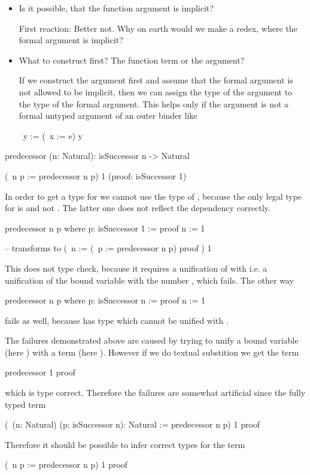\begin{itemize}
\item Is it possible, that the function argument is implicit?

    First reaction: Better not. Why on earth would we make a redex, where the
    formal argument is implicit?

\item What to construct first? The function term or the argument?

    If we construct the argument first and assume that the formal argument is
    not allowed to be implicit, then we can assign the type of the argument to
    the type of the formal argument. This helps only if the argument is not a
    formal untyped argument of an outer binder like
    \begin{alba}
    \ y := (\ x := e) y
    \end{alba}

\end{itemize}

\begin{alba}
    predecessor (n: Natural): isSuccessor n -> Natural

    (\ n p := predecessor n p) 1 (proof: isSuccessor 1)
\end{alba}

In order to get a type for  we cannot use the type of , because
the only legal type for  is  and not
. The latter one does not reflect the dependency correctly.

\begin{alba}
    predecessor n p where
        p: isSuccessor 1 := proof
        n := 1

    -- transforms to
    (\ n := (\ p := predecessor n p) proof ) 1
\end{alba}
%
This does not type check, because it requires a unification of  with  i.e. a unification of the bound variable 
with the number , which fails. The other way

\begin{alba}
    predecessor n p where
        p: isSuccessor n := proof
        n := 1
\end{alba}
%
fails as well, because  has type  which cannot
be unified with .

The failures demonstrated above are caused by trying to unify a bound variable
(here ) with a term (here ). However if we do textual substition
we get the term
%
\begin{alba}
    predecessor 1 proof
\end{alba}
%
which is type correct. Therefore the failures are somewhat artificial since the
fully typed term
\begin{alba}
    (\ (n: Natural) (p: isSuccessor n): Natural := predecessor n p) 1 proof
\end{alba}
%
Therefore it should be possible to infer correct types for the term
\begin{alba}
    (\ n p := predecessor n p) 1 proof
\end{alba}


